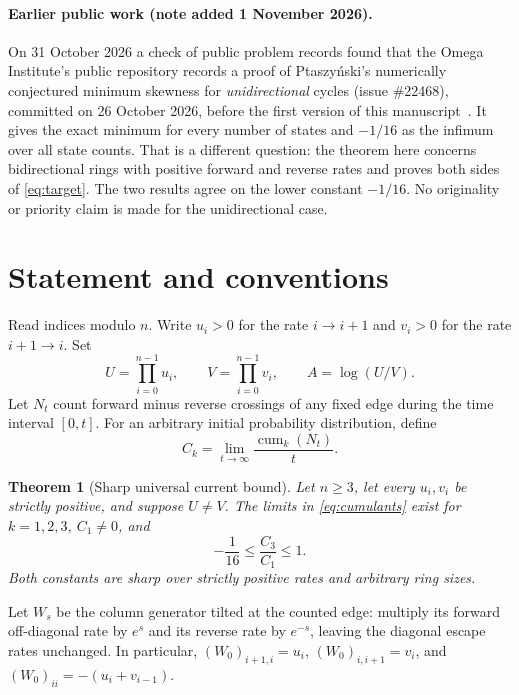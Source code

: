 \documentclass[11pt,a4paper]{article}
\numberwithin{equation}{section}
\newtheorem{theorem}{Theorem}[section]
\theoremstyle{remark}
\newcommand{\cum}{\operatorname{cum}}
\begin{document}
\paragraph{Earlier public work (note added 1 November 2026).}
On 31 October 2026 a check of public problem records found that the Omega
Institute's public repository records a proof of Ptaszy\'nski's numerically
conjectured minimum skewness for \emph{unidirectional} cycles (issue
\#22468), committed on 26 October 2026, before the first version of this
manuscript~\cite{OmegaUnicyclic}. It gives the exact minimum for every
number of states and $-1/16$ as the infimum over all state counts. That is a
different question: the theorem here concerns bidirectional rings with
positive forward and reverse rates and proves both sides of
\eqref{eq:target}. The two results agree on the lower constant $-1/16$. No
originality or priority claim is made for the unidirectional case.

\section{Statement and conventions}\label{sec:statement}

Read indices modulo $n$. Write $u_i>0$ for the rate $i\to i+1$ and $v_i>0$
for the rate $i+1\to i$. Set
\begin{equation}\label{eq:UV}
  U=\prod_{i=0}^{n-1}u_i,\qquad
  V=\prod_{i=0}^{n-1}v_i,\qquad
  A=\log(U/V).
\end{equation}
Let $N_t$ count forward minus reverse crossings of any fixed edge during
the time interval $[0,t]$. For an arbitrary initial probability distribution,
define
\begin{equation}\label{eq:cumulants}
  C_k=\lim_{t\to\infty}\frac{\cum_k(N_t)}{t}.
\end{equation}

\begin{theorem}[Sharp universal current bound]\label{thm:main}
Let $n\ge3$, let every $u_i,v_i$ be strictly positive, and suppose $U\ne V$.
The limits in \eqref{eq:cumulants} exist for $k=1,2,3$, $C_1\ne0$, and
\[
  \boxed{\displaystyle -\frac1{16}\le\frac{C_3}{C_1}\le1.}
\]
Both constants are sharp over strictly positive rates and arbitrary ring
sizes.
\end{theorem}

Let $W_s$ be the column generator tilted at the counted edge: multiply its
forward off-diagonal rate by $e^s$ and its reverse rate by $e^{-s}$, leaving
the diagonal escape rates unchanged. In particular,
$(W_0)_{i+1,i}=u_i$, $(W_0)_{i,i+1}=v_i$, and
$(W_0)_{ii}=-(u_i+v_{i-1})$.
\end{document}
